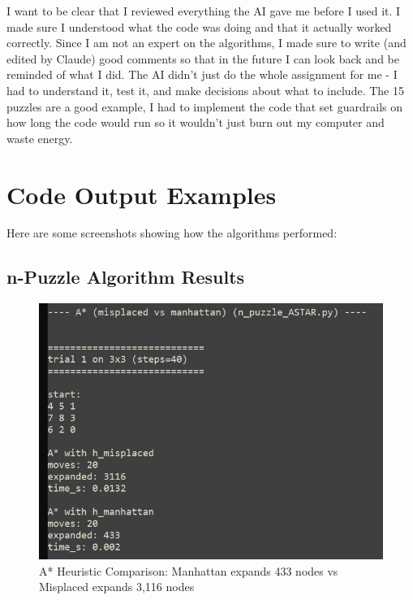 \documentclass[letterpaper]{article}
\begin{document}
I want to be clear that I reviewed everything the AI gave me before I used it. I made sure I understood what the code was doing and that it actually worked correctly. Since I am not an expert on the algorithms, I made sure to write (and edited by Claude) good comments so that in the future I can look back and be reminded of what I did.  The AI didn't just do the whole assignment for me - I had to understand it, test it, and make decisions about what to include.  The 15 puzzles are a good example, I had to implement the code that set guardrails on how long the code would run so it wouldn't just burn out my computer and waste energy.

\section{Code Output Examples}

Here are some screenshots showing how the algorithms performed:

\subsection{n-Puzzle Algorithm Results}

\begin{figure}[h]
\centering
\includegraphics[width=0.85\columnwidth]{astar_3x3.jpg}
\caption{A* Heuristic Comparison: Manhattan expands 433 nodes vs Misplaced expands 3,116 nodes}
\end{figure}
\end{document}
